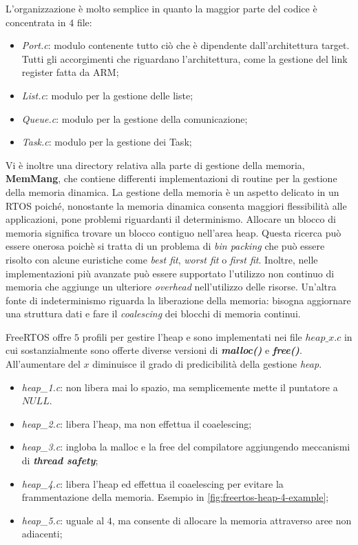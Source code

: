 \documentclass{article}
\begin{document}
L'organizzazione è molto semplice in quanto la maggior parte del codice è concentrata in $4$ file:
\begin{itemize}
  \item \textit{Port.c}: modulo contenente tutto ciò che è dipendente dall’architettura target. Tutti gli accorgimenti che riguardano l’architettura, come la gestione del link register fatta da
ARM;
  \item \textit{List.c}: modulo per la gestione delle liste;
  \item \textit{Queue.c}: modulo per la gestione della comunicazione;
  \item \textit{Task.c}: modulo per la gestione dei Task;
\end{itemize}

Vi è inoltre una directory relativa alla parte di gestione della memoria, \textbf{MemMang}, che contiene differenti implementazioni di routine per la gestione della memoria dinamica. La gestione della memoria è un aspetto delicato in un RTOS poiché, nonostante la memoria dinamica consenta maggiori flessibilità alle applicazioni, pone problemi riguardanti il determinismo. Allocare un blocco di memoria significa trovare un blocco contiguo nell'area heap. Questa ricerca può essere onerosa poichè si tratta di un problema di \textit{bin packing} che può essere risolto con alcune euristiche come \textit{best fit}, \textit{worst fit} o \textit{first fit}. Inoltre, nelle implementazioni più avanzate può essere supportato l'utilizzo non continuo di memoria che aggiunge un ulteriore \textit{overhead} nell'utilizzo delle risorse. Un'altra fonte di indeterminismo riguarda la liberazione della memoria: bisogna aggiornare una struttura dati e fare il \textit{coalescing} dei blocchi di memoria continui.

FreeRTOS offre $5$ profili per gestire l'heap e sono implementati nei file $heap\_x.c$ in cui sostanzialmente sono offerte diverse versioni di \textbf{\textit{malloc()}} e \textbf{\textit{free()}}. All'aumentare del $x$ diminuisce il grado di predicibilità della gestione \textit{heap}. 
\begin{itemize}
  \item \textit{heap\_1.c}: non libera mai lo spazio, ma semplicemente mette il puntatore a $NULL$. 
  \item \textit{heap\_2.c}: libera l'heap, ma non effettua il coaelescing;
  \item \textit{heap\_3.c}: ingloba la malloc e la free del compilatore aggiungendo meccanismi di \textbf{\textit{thread safety}};
  \item \textit{heap\_4.c}: libera l'heap ed effettua il coaelescing per evitare la frammentazione della memoria. Esempio in \cref{fig:freertos-heap-4-example};
  \item \textit{heap\_5.c}: uguale al $4$, ma consente di allocare la memoria attraverso aree non adiacenti; 
\end{itemize}
\end{document}
